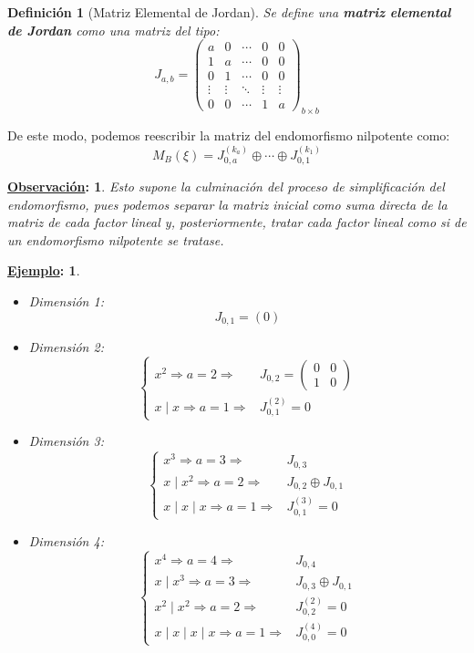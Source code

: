 \documentclass[10pt,a4paper,openright]{book}
\theoremstyle{break}
\newtheorem*{defi}{Definición}
\newtheorem*{obs}{\underline{Observación}:}
\newtheorem*{ej}{\underline{Ejemplo}:}
\begin{document}
\begin{defi}[Matriz Elemental de Jordan]
Se define una \textbf{matriz elemental de Jordan} como una matriz del tipo:
$$J_{a,b}=\begin{pmatrix}
a&0&\cdots &0 &0\\
1&a&\cdots &0 &0\\
0&1&\cdots &0 &0\\
\vdots & \vdots& \ddots & \vdots & \vdots \\
0&0&\cdots & 1&a
\end{pmatrix}_{b\times b}$$
\end{defi}
De este modo, podemos reescribir la matriz del endomorfismo nilpotente como:
$$M_B(\xi)=J_{0,a}^{(k_a)}\oplus \cdots \oplus J_{0,1}^{(k_1)}$$
\begin{obs}
Esto supone la culminación del proceso de simplificación del endomorfismo, pues podemos separar la matriz inicial como suma directa de la matriz de cada factor lineal y, posteriormente, tratar cada factor lineal como si de un endomorfismo nilpotente se tratase.
\end{obs}
\begin{ej}
\begin{itemize}
\item Dimensión 1:
$$J_{0,1}=(0)$$
\item Dimensión 2:
$$\begin{cases}
x^2\Rightarrow a=2\Rightarrow & J_{0,2}=\begin{pmatrix} 0&0 \\ 1&0\end{pmatrix} \\
x\mid x\Rightarrow a=1 \Rightarrow  & J_{0,1}^{(2)} =0
\end{cases}$$
\item Dimensión 3:
$$\begin{cases}
x^3\Rightarrow a=3\Rightarrow & J_{0,3} \\
x\mid x^2 \Rightarrow a=2\Rightarrow & J_{0,2}\oplus J_{0,1}\\
x\mid x\mid x\Rightarrow a=1\Rightarrow & J_{0,1}^{(3)} = 0
\end{cases}$$
\item Dimensión 4:
$$\begin{cases}
x^4\Rightarrow a=4\Rightarrow & J_{0,4} \\
x\mid x^3 \Rightarrow a=3\Rightarrow & J_{0,3}\oplus J_{0,1}\\
x^2\mid x^2 \Rightarrow a=2\Rightarrow & J_{0,2}^{(2)} = 0 \\
x \mid x \mid x \mid x \Rightarrow a = 1 \Rightarrow & J_{0,0}^{(4)} = 0
\end{cases}$$
\end{itemize}
\end{ej}
\end{document}
